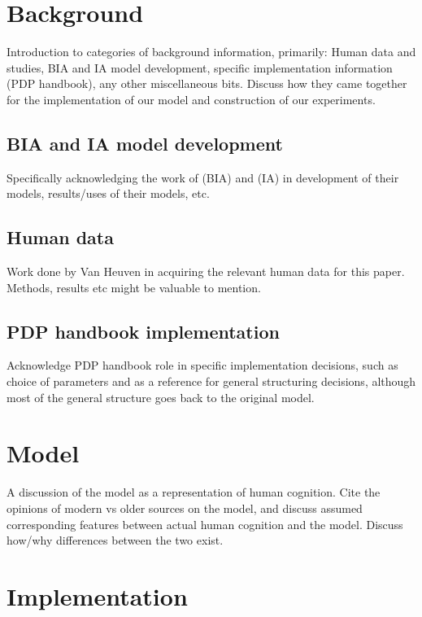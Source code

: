 \documentclass[10pt,letterpaper]{article}
\begin{document}
\section{Background}

Introduction to categories of background information, primarily: Human data and studies, BIA and IA model development, specific implementation information (PDP handbook), any other miscellaneous bits. Discuss how they came together for the implementation of our model and construction of our experiments.


\subsection{BIA and IA model development}

Specifically acknowledging the work of \cite{DijkstraVanheuven1998a} (BIA) and \cite{MclellandRumelhart1981a} (IA) in development of their models, results/uses of their models, etc. 

\subsection{Human data}

Work done by Van Heuven in acquiring the relevant human data for this paper. Methods, results etc might be valuable to mention.

\subsection{PDP handbook implementation}

Acknowledge PDP handbook role in specific implementation decisions, such as choice of parameters and as a reference for general structuring decisions, although most of the general structure goes back to the original \cite{MclellandRumelhart1981a} model.

\section{Model}

A discussion of the model as a representation of human cognition. Cite the opinions of modern vs older sources on the model, and discuss assumed corresponding features between actual human cognition and the model. Discuss how/why differences between the two exist. 

\section{Implementation}
\end{document}

